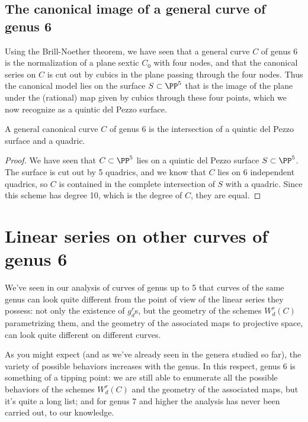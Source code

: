 \subsection{The canonical image of a general curve of genus 6}

Using the Brill-Noether theorem, we have seen that a general curve $C$ of genus 6 is the normalization of a plane sextic $C_0$ with four nodes, and that the canonical series on $C$ is cut out by cubics in the plane passing through the four nodes. Thus the canonical model lies on the surface $S \subset \PP^5$ that is the image of the plane under the (rational) map given by cubics through these four points, which we now recognize as a quintic del Pezzo surface.

\begin{theorem}
A general canonical curve $C$ of genus 6 is the intersection of a quintic del Pezzo surface and a quadric. 
\end{theorem}

\begin{proof}
We have seen that $C \subset \PP^5$ lies on a quintic del Pezzo surface $S \subset \PP^5$. The surface is cut out by 5 quadrics, and we know that $C$ lies on 6 independent quadrics,
so $C$ is contained in the complete intersection of $S$ with a quadric. Since this scheme has degree 10, which is the degree of $C$, they are equal.
\end{proof}


\section{Linear series on other curves of genus 6}


We've seen in our analysis of curves of genus up to 5 that curves of the same genus can look quite different from the point of view of the linear series they possess: not only the existence of $g^r_d$s, but the geometry of the schemes $W^r_d(C)$ parametrizing them, and the geometry of the associated maps to projective space, can look quite different on different curves.

As you might expect (and as we've already seen in the genera studied so far), the variety of possible behaviors increases with the genus. In this respect, genus 6 is something of a tipping point: we are still able to enumerate all the possible behaviors of the schemes $W^r_d(C)$ and the geometry of the associated maps, but it's quite a long list; and for genus 7 and higher the analysis has never been carried out, to our knowledge.

